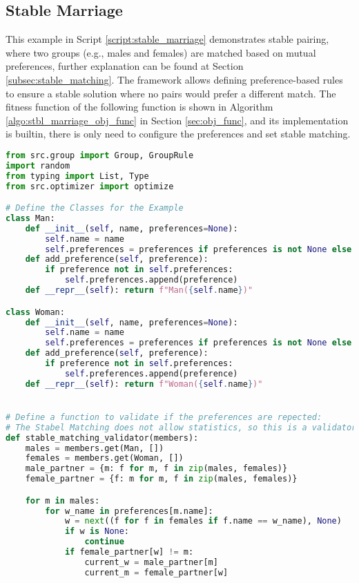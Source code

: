 \subsection{Stable Marriage}
This example in Script \ref{script:stable_marriage} demonstrates stable pairing, where two groups (e.g., males and females) are matched based on mutual preferences, further explanation can be found at Section \ref{subsec:stable_matching}. The framework allows defining preference-based rules to ensure a stable solution where no pairs would prefer a different match.
The fitness function of the following function is shown in Algorithm \ref{algo:stbl_marriage_obj_func} in Section \ref{sec:obj_func}, and its implementation is builtin, there is only need to configure the preferences and set stable matching.

\begin{lstlisting}[language=Python, caption={Creating and solving the Stable Marriage Problem using this framework.}, label={script:stable_marriage}]
from src.group import Group, GroupRule
import random
from typing import List, Type
from src.optimizer import optimize

# Define the Classes for the Example
class Man:
    def __init__(self, name, preferences=None):
        self.name = name
        self.preferences = preferences if preferences is not None else []
    def add_preference(self, preference):
        if preference not in self.preferences:
            self.preferences.append(preference)
    def __repr__(self): return f"Man({self.name})"

class Woman:
    def __init__(self, name, preferences=None):
        self.name = name
        self.preferences = preferences if preferences is not None else []
    def add_preference(self, preference):
        if preference not in self.preferences:
            self.preferences.append(preference)
    def __repr__(self): return f"Woman({self.name})"


# Define a function to validate if the preferences are repected:
# The Stabel Matching does not allow statistics, so this is a validator function.
def stable_matching_validator(members):
    males = members.get(Man, [])
    females = members.get(Woman, [])
    male_partner = {m: f for m, f in zip(males, females)}
    female_partner = {f: m for m, f in zip(males, females)}

    for m in males:
        for w_name in preferences[m.name]:
            w = next((f for f in females if f.name == w_name), None)
            if w is None:
                continue
            if female_partner[w] != m:
                current_w = male_partner[m]
                current_m = female_partner[w]


\end{lstlisting}
